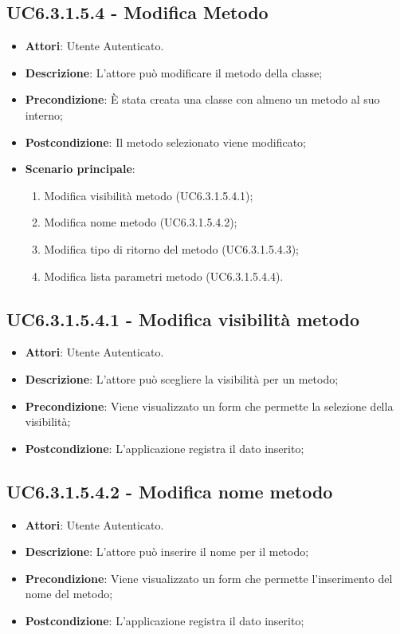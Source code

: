 \subsection{UC6.3.1.5.4 - Modifica Metodo} 
\label{ssec:UC6.3.1.5.4} 
\begin{itemize} 
\item \textbf{Attori}: Utente Autenticato.
\item \textbf{Descrizione}: L'attore può modificare il metodo della classe;
\item \textbf{Precondizione}: È stata creata una classe con almeno un metodo al suo interno;
\item \textbf{Postcondizione}: Il metodo selezionato viene modificato;
\item \textbf{Scenario principale}: \begin{enumerate}\item Modifica visibilità metodo (UC6.3.1.5.4.1);\item Modifica nome metodo (UC6.3.1.5.4.2);\item Modifica tipo di ritorno del metodo (UC6.3.1.5.4.3);\item Modifica lista parametri metodo (UC6.3.1.5.4.4). 
 \end{enumerate}
\end{itemize} 
\subsection{UC6.3.1.5.4.1 - Modifica visibilità metodo} 
\label{ssec:UC6.3.1.5.4.1} 
\begin{itemize} 
\item \textbf{Attori}: Utente Autenticato.
\item \textbf{Descrizione}: L'attore può scegliere la visibilità per un metodo;
\item \textbf{Precondizione}: Viene visualizzato un form che permette la selezione della visibilità;
\item \textbf{Postcondizione}: L'applicazione registra il dato inserito;
\end{itemize} 
\subsection{UC6.3.1.5.4.2 - Modifica nome metodo} 
\label{ssec:UC6.3.1.5.4.2} 
\begin{itemize} 
\item \textbf{Attori}: Utente Autenticato.
\item \textbf{Descrizione}: L'attore può inserire il nome per il metodo;
\item \textbf{Precondizione}: Viene visualizzato un form che permette l'inserimento del nome del metodo;
\item \textbf{Postcondizione}: L'applicazione registra il dato inserito;
\end{itemize} 
